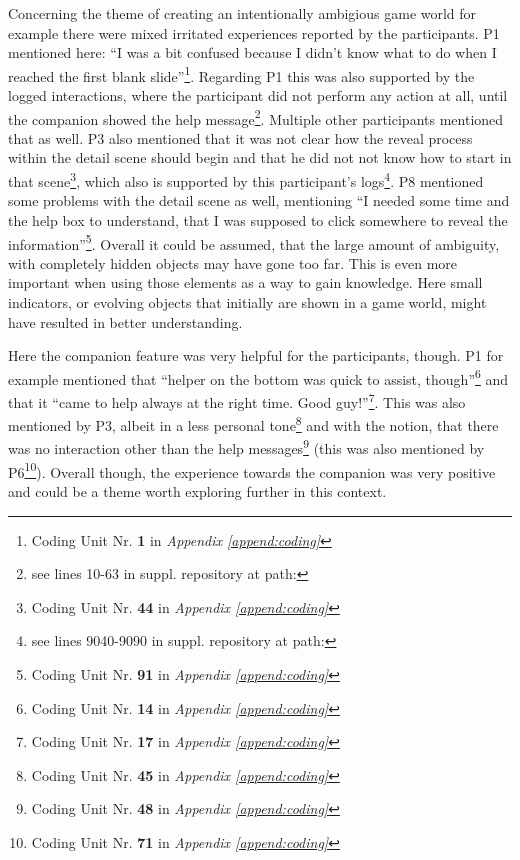 Concerning the theme of creating an intentionally ambigious game world for example there were mixed irritated experiences reported by the participants. P1 mentioned here: \enquote{I was a bit confused because I didn't know what to do when I reached the first blank slide}\footnote{Coding Unit Nr. \textbf{1} in \textit{Appendix \ref{append:coding}}}. Regarding P1 this was also supported by the logged interactions, where the participant did not perform any action at all, until the companion showed the help message\footnote{see lines 10-63 in suppl. repository at path: }. Multiple other participants mentioned that as well. P3 also mentioned that it was not clear how the reveal process within the detail scene should begin and that he did not not know how to start in that scene\footnote{Coding Unit Nr. \textbf{44} in \textit{Appendix \ref{append:coding}}}, which also is supported by this participant's logs\footnote{see lines 9040-9090 in suppl. repository at path: }. P8 mentioned some problems with the detail scene as well, mentioning \enquote{I needed some time and the help box to understand, that I was supposed to click somewhere to reveal the information}\footnote{Coding Unit Nr. \textbf{91} in \textit{Appendix \ref{append:coding}}}. Overall it could be assumed, that the large amount of ambiguity, with completely hidden objects may have gone too far. This is even more important when using those elements as a way to gain knowledge. Here small indicators, or evolving objects that initially are shown in a game world, might have resulted in better understanding.

Here the companion feature was very helpful for the participants, though. P1 for example mentioned that \enquote{helper on the bottom was quick to assist, though}\footnote{Coding Unit Nr. \textbf{14} in \textit{Appendix \ref{append:coding}}} and that it \enquote{came to help always at the right time. Good guy!}\footnote{Coding Unit Nr. \textbf{17} in \textit{Appendix \ref{append:coding}}}. This was also mentioned by P3, albeit in a less personal tone\footnote{Coding Unit Nr. \textbf{45} in \textit{Appendix \ref{append:coding}}} and with the notion, that there was no interaction other than the help messages\footnote{Coding Unit Nr. \textbf{48} in \textit{Appendix \ref{append:coding}}} (this was also mentioned by P6\footnote{Coding Unit Nr. \textbf{71} in \textit{Appendix \ref{append:coding}}}). Overall though, the experience towards the companion was very positive and could be a theme worth exploring further in this context.

